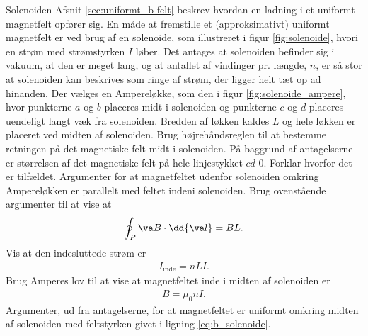 \begin{opgave}{Solenoiden}
    Afsnit \ref{sec:uniformt_b-felt} beskrev hvordan en ladning i et uniformt magnetfelt opfører sig. En måde at fremstille et (approksimativt) uniformt magnetfelt er ved brug af en solenoide, som illustreret i figur \ref{fig:solenoide}, hvori en strøm med strømstyrken $I$ løber. Det antages at solenoiden befinder sig i vakuum, at den er meget lang, og at antallet af  vindinger pr. længde, $n$, er så stor at solenoiden kan beskrives som ringe af strøm, der ligger helt tæt op ad hinanden. Der vælges en Ampereløkke, som den i figur \ref{fig:solenoide_ampere}, hvor punkterne $a$ og $b$ placeres midt i solenoiden og punkterne $c$ og $d$ placeres uendeligt langt væk fra solenoiden. Bredden af løkken kaldes $L$ og hele løkken er placeret ved midten af solenoiden.
    \opg Brug højrehåndsreglen til at bestemme retningen på det magnetiske felt midt i solenoiden.
    \opg På baggrund af antagelserne er størrelsen af det magnetiske felt på hele linjestykket $cd$ 0. Forklar hvorfor det er tilfældet.
    \opg Argumenter for at magnetfeltet udenfor solenoiden omkring Ampereløkken er parallelt med feltet indeni solenoiden.
    \opg Brug ovenstående argumenter til at vise at
    \begin{align*}
        \oint_P \va B \cdot \dd{\va l} = BL.
    \end{align*}
    \opg Vis at den indesluttede strøm er
    \begin{align*}
        I_\mathrm{inde} = nLI.
    \end{align*}
    \opg Brug Amperes lov til at vise at magnetfeltet inde i midten af solenoiden er
    \begin{align} \label{eq:b_solenoide}
        B = \mu_0nI.
    \end{align}
    \opg Argumenter, ud fra antagelserne, for at magnetfeltet er uniformt omkring midten af solenoiden med feltstyrken givet i ligning \ref{eq:b_solenoide}.
\end{opgave}

